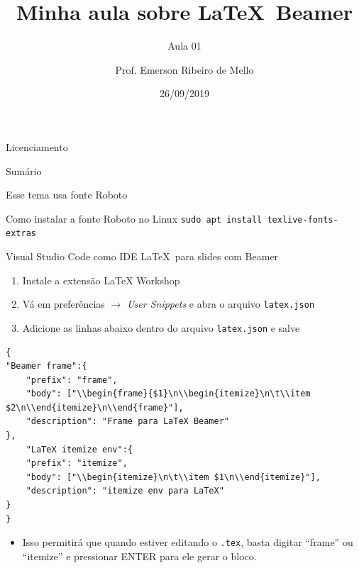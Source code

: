 \documentclass{beamer}
\title{Minha aula sobre \LaTeX~Beamer}
\subtitle{Aula 01}
\author{Prof. Emerson Ribeiro de Mello}
\institute{%
\href{mello@ifsc.edu.br}{mello@ifsc.edu.br}%
}%
\date{26/09/2019}
\begin{document}
\begin{frame}[plain]
    \titlepage
\end{frame}

\begin{frame}{Licenciamento}
    \licenciamentoLivre
\end{frame}

\begin{frame}{Sumário}
    \tableofcontents
\end{frame}


\jsonp
\lstset{numbers=none}

\begin{frame}{Esse tema usa fonte Roboto}
\begin{alertblock}{Como instalar a fonte Roboto no Linux}
     \texttt{sudo apt install texlive-fonts-extras}
\end{alertblock}
\end{frame}

\begin{frame}[fragile]{Visual Studio Code como IDE \LaTeX~para slides com Beamer}
\begin{enumerate}
    \item Instale a extensão LaTeX Workshop
    \item Vá em preferências \(\rightarrow\) \textit{User Snippets} e abra o arquivo \texttt{latex.json}
    \item Adicione as linhas abaixo dentro do arquivo \texttt{latex.json} e salve
\end{enumerate}

\begin{lstlisting}
{
"Beamer frame":{
    "prefix": "frame",
    "body": ["\\begin{frame}{$1}\n\\begin{itemize}\n\t\\item $2\n\\end{itemize}\n\\end{frame}"],
    "description": "Frame para LaTeX Beamer"
},
    "LaTeX itemize env":{
    "prefix": "itemize",
    "body": ["\\begin{itemize}\n\t\\item $1\n\\end{itemize}"],
    "description": "itemize env para LaTeX"
}
}
\end{lstlisting}
\begin{itemize}
    \item Isso permitirá que quando estiver editando o \texttt{.tex},  basta digitar ``frame'' ou ``itemize'' e pressionar ENTER para ele gerar o bloco.
\end{itemize}
\end{frame}
\end{document}
